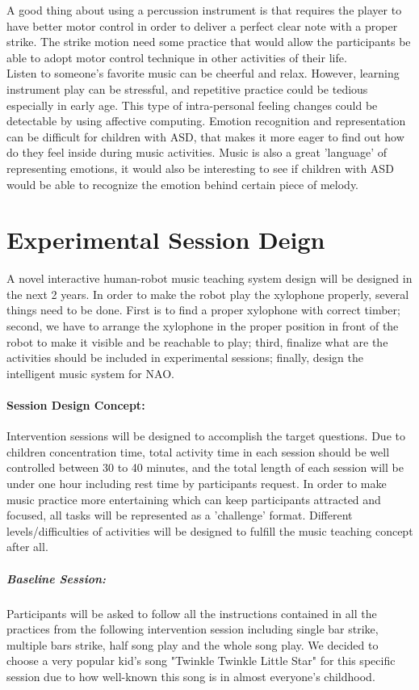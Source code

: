 \documentclass[12pt, a4paper]{article}
\begin{document}
A good thing about using a percussion instrument is that requires the player to have better
motor control in order to deliver a perfect clear note with a proper strike. The strike motion
need some practice that would allow the participants be able to adopt motor control technique
in other activities of their life.\\

Listen to someone's favorite music can be cheerful and relax. However, learning instrument 
play can be stressful, and repetitive practice could be tedious especially in early age. This 
type of intra-personal feeling changes could be detectable by using affective computing. 
Emotion recognition and representation can be difficult for children with ASD, that makes 
it more eager to find out how do they feel inside during music activities. Music is also
a great 'language' of representing emotions, it would also be interesting to see if children
with ASD would be able to recognize the emotion behind certain piece of melody.

 
\section*{Experimental Session Deign}
A novel interactive human-robot music teaching system design will be designed in 
the next 2 years. In order to make the robot play the xylophone properly, several things need 
to be done. First is to find a proper xylophone with correct timber; 
second, we have to arrange the xylophone in the proper position in front of the robot 
to make it visible and be reachable to play; third, finalize what are the activities 
should be included in experimental sessions; finally, design the intelligent music system for NAO.\\

\paragraph{Session Design Concept:}
Intervention sessions will be designed to accomplish the target questions. Due to children
concentration time, total activity time in each session should be well controlled between 
30 to 40 minutes, and the total length of each session will be under one hour including rest
time by participants request. In order to make music practice more entertaining which can 
keep participants attracted and focused, all tasks will be represented as a 'challenge' format.
Different levels/difficulties of activities will be designed to fulfill the music teaching
concept after all. \\
\subparagraph{Baseline Session: }Participants will be asked to follow all the 
instructions contained in all the practices from the following intervention session 
including single bar strike, multiple bars strike, half song play and the whole
song play. We decided to choose a very popular kid's song "Twinkle Twinkle Little Star" 
for this specific session due to how well-known this song is in almost 
everyone's childhood.\\
\end{document}
